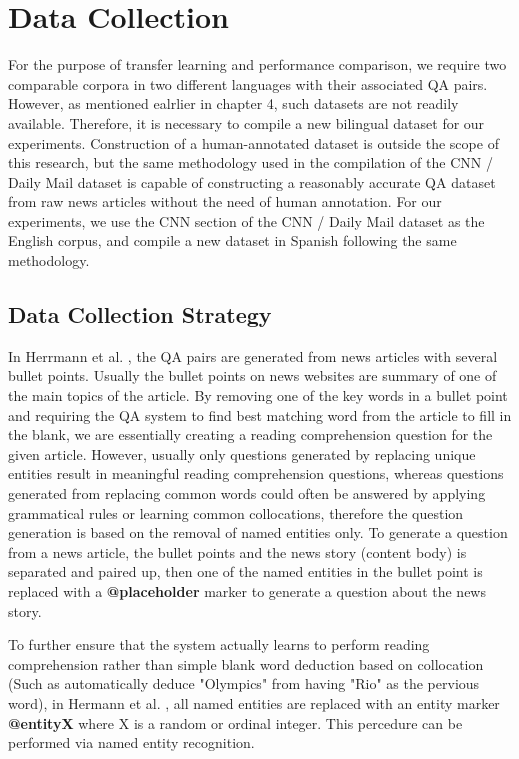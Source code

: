 \documentclass[]{article}
\begin{document}
\section{Data Collection}

For the purpose of transfer learning and performance comparison, we require two comparable corpora in two different languages with their associated QA pairs. However, as mentioned ealrlier in chapter 4, such datasets are not readily available. Therefore, it is necessary to compile a new bilingual dataset for our experiments. Construction of a human-annotated dataset is outside the scope of this research, but the same methodology used in the compilation of the CNN / Daily Mail dataset \cite{hermann2015teaching} is capable of constructing a reasonably accurate QA dataset from raw news articles without the need of human annotation. For our experiments, we use the CNN section of the CNN / Daily Mail dataset as the English corpus, and compile a new dataset in Spanish following the same methodology.

\subsection{Data Collection Strategy}

In Herrmann et al. \cite{hermann2015teaching}, the QA pairs are generated from news articles with several bullet points. Usually the bullet points on news websites are summary of one of the main topics of the article. By removing one of the key words in a bullet point and requiring the QA system to find best matching word from the article to fill in the blank, we are essentially creating a reading comprehension question for the given article. However, usually only questions generated by replacing unique entities result in meaningful reading comprehension questions, whereas questions generated from replacing common words could often be answered by applying grammatical rules or learning common collocations, therefore the question generation is based on the removal of named entities only. To generate a question from a news article, the bullet points and the news story (content body) is separated and paired up, then one of the named entities in the bullet point is replaced with a \textbf{@placeholder} marker to generate a question about the news story.

To further ensure that the system actually learns to perform reading comprehension rather than simple blank word deduction based on collocation (Such as automatically deduce "Olympics" from having "Rio" as the pervious word), in Hermann et al. \cite{hermann2015teaching}, all named entities are replaced with an entity marker \textbf{@entityX} where X is a random or ordinal integer. This percedure can be performed via named entity recognition.
\end{document}
